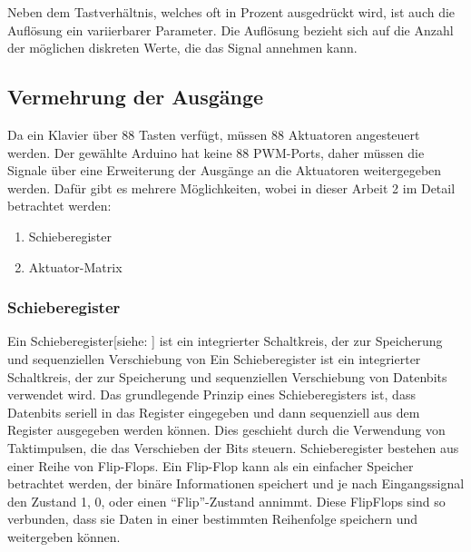Neben dem Tastverhältnis, welches oft in Prozent ausgedrückt wird, ist auch die Auflösung ein variierbarer Parameter.
Die Auflösung bezieht sich auf die Anzahl der möglichen diskreten Werte, die das Signal annehmen kann.


\subsection{Vermehrung der Ausgänge}\label{output}

Da ein Klavier über 88 Tasten verfügt, müssen 88 Aktuatoren angesteuert werden. Der gewählte Arduino hat keine 88 \ac{PWM}-Ports, daher
müssen die Signale über eine Erweiterung der Ausgänge an die Aktuatoren weitergegeben werden. Dafür gibt es mehrere Möglichkeiten,
wobei in dieser Arbeit 2 im Detail betrachtet werden:

\begin{enumerate}
	\item Schieberegister
	\item Aktuator-Matrix
\end{enumerate}


\subsubsection{Schieberegister}
Ein Schieberegister[siehe: \cite*[siehe ][]{Schieberegister}] ist ein integrierter Schaltkreis, der zur Speicherung und sequenziellen Verschiebung von
Ein Schieberegister ist ein integrierter Schaltkreis, der zur Speicherung und sequenziellen Verschiebung von
Datenbits verwendet wird.\newline
Das grundlegende Prinzip eines Schieberegisters ist, dass Datenbits seriell in das Register eingegeben und dann
sequenziell aus dem Register ausgegeben werden können.
Dies geschieht durch die Verwendung von Taktimpulsen, die das Verschieben der Bits steuern.\newline
Schieberegister bestehen aus einer Reihe von Flip-Flops.
Ein Flip-Flop kann als ein einfacher Speicher betrachtet werden, der binäre Informationen speichert und je nach
Eingangssignal den Zustand 1, 0, oder einen \enquote{Flip}-Zustand annimmt.
Diese FlipFlops sind so verbunden, dass sie Daten in einer bestimmten Reihenfolge speichern und weitergeben können.

